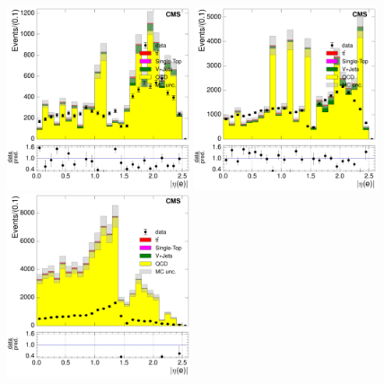 \begin{figure}[hbtp]
    \centering
      \includegraphics[width=0.48\textwidth]{Chapters/04_Analysis/04b_XSections/images/control_plots/before_fit/7TeV/qcd_plots/QCD_electron_AbsEta_conversion_control_region_0btag_with_ratio}\hfill
      \includegraphics[width=0.48\textwidth]{Chapters/04_Analysis/04b_XSections/images/control_plots/before_fit/8TeV/qcd_plots/QCD_electron_AbsEta_conversion_control_region_0btag_with_ratio}\\
      \includegraphics[width=0.48\textwidth]{Chapters/04_Analysis/04b_XSections/images/control_plots/before_fit/7TeV/qcd_plots/QCD_electron_AbsEta_non_iso_control_region_0btag_with_ratio}\hfill

\end{figure}
